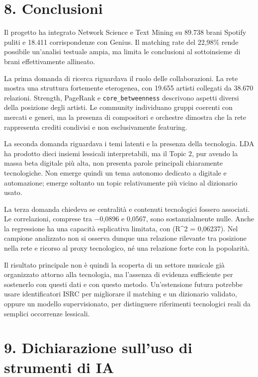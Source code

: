 \documentclass[
]{article}
\begin{document}
\section{8. Conclusioni}\label{conclusioni}

Il progetto ha integrato Network Science e Text Mining su 89.738 brani
Spotify puliti e 18.411 corrispondenze con Genius. Il matching rate del
22,98\% rende possibile un'analisi testuale ampia, ma limita le
conclusioni al sottoinsieme di brani effettivamente allineato.

La prima domanda di ricerca riguardava il ruolo delle collaborazioni. La
rete mostra una struttura fortemente eterogenea, con 19.655 artisti
collegati da 38.670 relazioni. Strength, PageRank e
\texttt{core\_betweenness} descrivono aspetti diversi della posizione
degli artisti. Le community individuano gruppi coerenti con mercati e
generi, ma la presenza di compositori e orchestre dimostra che la rete
rappresenta crediti condivisi e non esclusivamente featuring.

La seconda domanda riguardava i temi latenti e la presenza della
tecnologia. LDA ha prodotto dieci insiemi lessicali interpretabili, ma
il Topic 2, pur avendo la massa beta digitale più alta, non presenta
parole principali chiaramente tecnologiche. Non emerge quindi un tema
autonomo dedicato a digitale e automazione; emerge soltanto un topic
relativamente più vicino al dizionario usato.

La terza domanda chiedeva se centralità e contenuti tecnologici fossero
associati. Le correlazioni, comprese tra −0,0896 e 0,0567, sono
sostanzialmente nulle. Anche la regressione ha una capacità esplicativa
limitata, con (R\^{}2 = 0,06237). Nel campione analizzato non si osserva
dunque una relazione rilevante tra posizione nella rete e ricorso al
proxy tecnologico, né una relazione forte con la popolarità.

Il risultato principale non è quindi la scoperta di un settore musicale
già organizzato attorno alla tecnologia, ma l'assenza di evidenza
sufficiente per sostenerlo con questi dati e con questo metodo.
Un'estensione futura potrebbe usare identificatori ISRC per migliorare
il matching e un dizionario validato, oppure un modello supervisionato,
per distinguere riferimenti tecnologici reali da semplici occorrenze
lessicali.

\section{9. Dichiarazione sull'uso di strumenti di
IA}\label{dichiarazione-sulluso-di-strumenti-di-ia}
\end{document}
